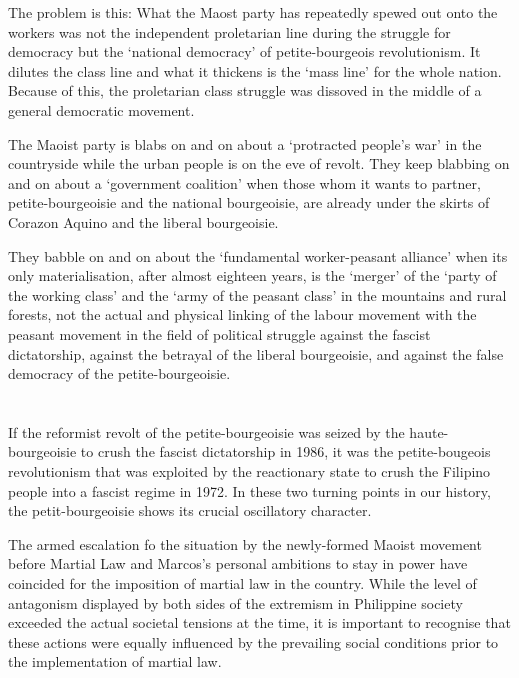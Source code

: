 The problem is this:
What the Maost party 
has repeatedly spewed out onto the workers
was not the independent proletarian line 
during the struggle for democracy
but the `national democracy'
of petite-bourgeois revolutionism.
It dilutes the class line 
and what it thickens is the `mass line'
for the whole nation. 
Because of this, 
the proletarian class struggle was dissoved
in the middle of a general democratic movement.

The Maoist party is blabs on and on 
about a `protracted people's war' in the countryside 
while the urban people is on the eve of revolt. 
They keep blabbing on and on about a `government coalition'
when those whom it wants to partner, 
petite-bourgeoisie and the national bourgeoisie,
are already under the skirts of Corazon Aquino and the liberal bourgeoisie.


They babble on and on about the `fundamental worker-peasant alliance'
when its only materialisation,
after almost eighteen years, 
is the `merger' of the `party of the working class' 
and the `army of the peasant class' in the mountains and rural forests,
not the actual and physical linking 
of the labour movement with the peasant movement 
in the field of political struggle against the fascist dictatorship, 
against the betrayal of the liberal bourgeoisie, 
and against the false democracy of the petite-bourgeoisie.


\section{}
If the reformist revolt of the petite-bourgeoisie 
was seized by the haute-bourgeoisie
to crush the fascist dictatorship in 1986,
it was the petite-bougeois revolutionism 
that was exploited
by the reactionary state 
to crush the Filipino people 
into a fascist regime in 1972.
In these two turning points in our history,
the petit-bourgeoisie shows its crucial oscillatory character.

The armed escalation fo the situation 
by the newly-formed Maoist movement 
before Martial Law and Marcos's personal ambitions 
to stay in power 
have coincided for the imposition of martial law in the country.
While the level of antagonism displayed by both sides of the extremism 
in Philippine society 
exceeded the actual societal tensions at the time, 
it is important to recognise 
that these actions were equally influenced 
by the prevailing social conditions 
prior to the implementation of martial law.



